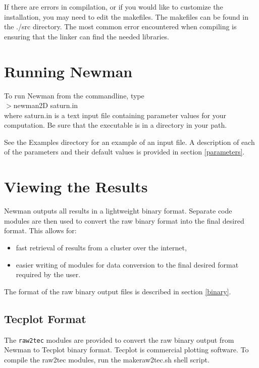 \documentclass[11pt]{article}
\begin{document}
\noindent If there are errors in compilation, or if you would like to customize the installation, you may need to edit the makefiles.  The makefiles can be found in the ./src directory.  The most common error encountered when compiling is ensuring that the linker can find the needed libraries.




\section{Running Newman}
To run Newman from the commandline, type\\

\noindent$>$newman2D saturn.in\\

\noindent where saturn.in is a text input file containing parameter values for your computation.  Be sure that the executable is in a directory in your path.  

See the Examples directory for an example of an input file.  A description of each of the parameters and their default values is provided in section \ref{parameters}.

\section{Viewing the Results}
Newman outputs all results in a lightweight binary format.  Separate code modules are then used to convert the raw binary format into the final desired format.  This allows for:
\begin{itemize} 
\item fast retrieval of results from a cluster over the internet,
\item easier writing of modules for data conversion to the final desired format required by the user.
\end{itemize} 
The format of the raw binary output files is described in section \ref{binary}.

\subsection{Tecplot Format}
The \texttt{raw2tec} modules are provided to convert the raw binary output from Newman to Tecplot binary format.  Tecplot is commercial plotting software.  
To compile the raw2tec modules, run the makeraw2tec.sh shell script. \\
\end{document}

